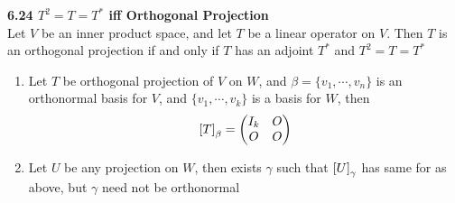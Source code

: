 \documentclass[11pt]{article}
\begin{document}
\begin{theorem*}
    \textbf{6.24 $T^2 = T = T^*$ iff Orthogonal Projection} \\
    Let $V$ be an inner product space, and let $T$ be a linear operator on $V$. Then $T$ is an orthogonal projection if and only if $T$ has an adjoint $T^*$ and $T^2 = T = T^*$
    \begin{enumerate}
        \item Let $T$ be orthogonal projection of $V$ on $W$, and $\beta = \{v_1, \cdots, v_n\}$ is an orthonormal basis for $V$, and $\{v_1, \cdots, v_k\}$ is a basis for $W$, then
        \[
            \left[ T \right]_{\beta} = 
            \begin{pmatrix}
                I_k & O \\
                O & O \\
            \end{pmatrix}    
        \]
        \item Let $U$ be any projection on $W$, then exists $\gamma$ such that $\left[ U \right]_{\gamma}$ has same for as above, but $\gamma$ need not be orthonormal
    \end{enumerate}
\end{theorem*}
\end{document}
